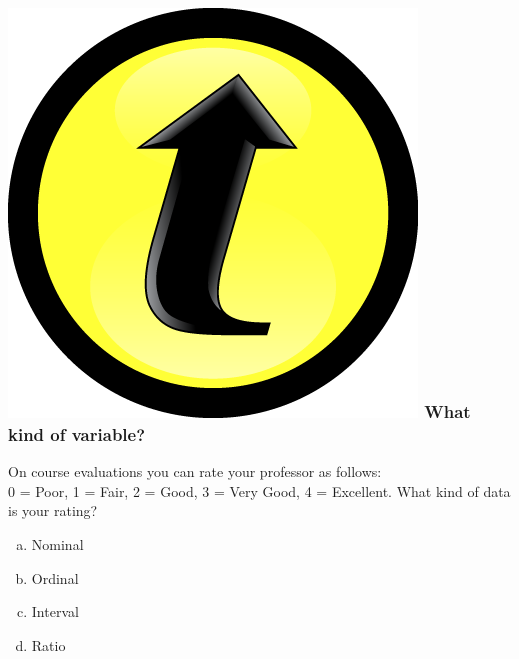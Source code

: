 \documentclass[handout]{beamer}
\begin{document}
\begin{frame}
\frametitle{\includegraphics[scale = 0.05]{./images/clicker} \hfill What kind of variable?}
On course evaluations you can rate your professor as follows:\\ 0 = Poor, 1 = Fair, 2 = Good,  3 = Very Good, 4 = Excellent. What kind of data is your rating?
	\begin{enumerate}[(a)]
\item Nominal
\item Ordinal
\item Interval
\item Ratio
\end{enumerate}
\end{frame}
\end{document}
